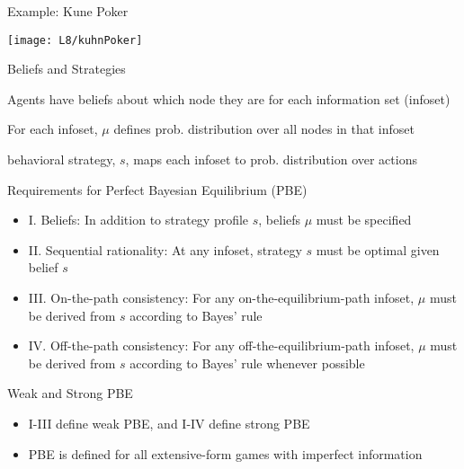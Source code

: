 \documentclass[11pt,aspectratio=169,handout]{beamer}
\begin{document}
  
  \begin{frame}{Example: Kune Poker}
   \begin{center}
    \texttt{[image: L8/kuhnPoker]}
   \end{center}
  \end{frame}
    
  
  \begin{frame}{Beliefs and Strategies}
   \begin{itemizes}[1.5em]
    \item Agents have \alert{beliefs} about which node they are for each information set (\alert{infoset})
    \item For each infoset, $\mu$ defines \alert{prob. distribution} over all nodes in that infoset
    \item \alert{behavioral strategy}, $s$, maps each infoset to prob. distribution over actions
   \end{itemizes}
  \end{frame}
  
  
  \begin{frame}{Requirements for Perfect Bayesian Equilibrium (PBE)}
   \begin{itemize}[<+->]
   \setlength{\itemsep}{1em}
    \item I. Beliefs: In addition to strategy profile $s$, beliefs $\mu$ must be specified
    \item II. \alert{Sequential rationality}: At any infoset, strategy $s$ must be optimal given belief $s$
    \item III. \alert{On-the-path consistency}: For any on-the-equilibrium-path infoset, $\mu$ must be derived from $s$ according to \alert{Bayes' rule}
    \item IV. \alert{Off-the-path consistency}: For any off-the-equilibrium-path infoset, $\mu$ must be derived from $s$ according to Bayes' rule \alert{whenever possible}
   \end{itemize}     
  \end{frame}

  
  \begin{frame}{Weak and Strong PBE}
   \begin{itemize}
   \setlength{\itemsep}{2em}
    \item I-III define \alert{weak PBE}, and I-IV define {strong PBE}
    \item PBE is defined for all extensive-form games with imperfect information
   \end{itemize}
  \end{frame}
  
\end{document}
